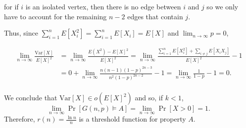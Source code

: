 for if $i$ is an isolated vertex, then there is no edge between $i$ and $j$ so we only have to account for the remaining $n - 2$ edges that contain $j$.  \par

Thus, since $\sum_{i = 1}^{n}E[X_i^2] =  \sum_{i = 1}^n E[X_i] = E[X]$ and $\lim_{n \to \infty} p = 0$,

\begin{align*}
    \lim_{n \to \infty} \frac{\text{Var}[X]}{E[X]^2} &= 
    \lim_{n \to \infty}\frac{E(X^2) - E[X]^2}{E[X]^2} = \lim_{n \to \infty} \frac{\sum_{i = 1}^n E[X_i^2] + \sum_{i \neq j}E[X_iX_j]}{E[X]^2} - 1 \\ &= 0 + \lim_{n \to \infty} \frac{ n(n - 1)(1 - p)^{2n - 3}}{n^2(1 - p)^{2n - 2}} - 1= \lim_{n \to \infty} \frac{1}{1 - p} - 1 = 0.\\
\end{align*} \par
We conclude that $\text{Var}[X] \in o(E[X]^2)$ and so, if $k < 1$, \[\lim_{n \to \infty} \Pr[G(n, p) \vDash A] = \lim_{n \to \infty} \Pr[X > 0] = 1.\] Therefore, $r(n) = \frac{\ln n}{n}$ is a threshold function for property $A$.
